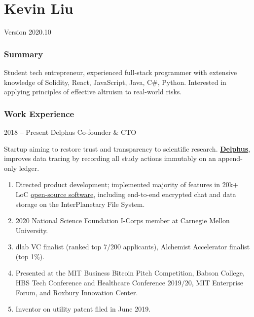 \documentclass[paper=letter]{tccv}
\begin{document}
\part{Kevin Liu}


Version 2020.10

\section{Summary}

Student tech entrepreneur, experienced full-stack programmer with extensive
knowledge of Solidity, React, JavaScript, Java, C\#, Python. Interested in
applying principles of effective altruism to real-world risks.

\section{Work Experience}

\begin{eventlist}

\item{2018 -- Present}
     {Delphus} {Co-founder \& CTO}

    Startup aiming to restore trust and transparency to scientific research.
    \href{https://delph.us}{\textbf{Delphus}}, improves data tracing by
    recording all study actions immutably on an append-only ledger.

\end{eventlist}

\vspace{-0.5cm}
\begin{enumerate}
     \item Directed product development; implemented majority of features in
     20k+ LoC
     \href{https://gitlab.scintillating.us/scintillating/delphus}{open-source
     software}, including end-to-end encrypted chat and data storage on the
     InterPlanetary File System.
     \item 2020 National Science Foundation I-Corps member at Carnegie Mellon
     University.
     \item dlab VC finalist (ranked top 7/200 applicants), Alchemist Accelerator
     finalist (top 1\%).
     \item Presented at the MIT Business Bitcoin Pitch Competition, Babson
     College, HBS Tech Conference and Healthcare Conference 2019/20, MIT
     Enterprise Forum, and Roxbury Innovation Center.
     \item Inventor on utility patent filed in June 2019.
\end{enumerate}
\end{document}
